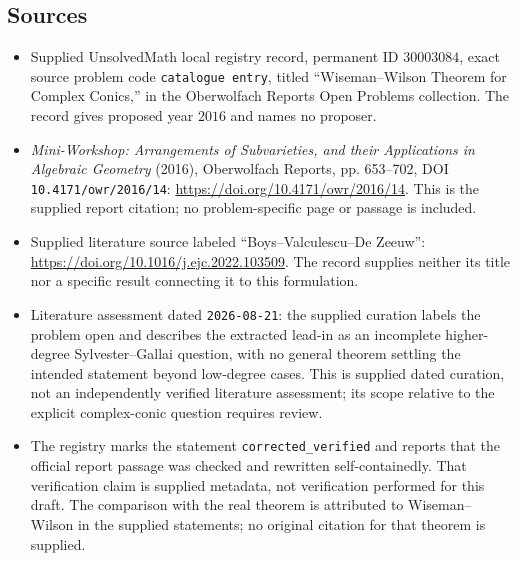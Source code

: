\documentclass[11pt]{article}
\begin{document}
\subsection{Sources}
\begin{itemize}
\item Supplied UnsolvedMath local registry record, permanent ID \(30003084\), exact source problem code \texttt{catalogue entry}, titled ``Wiseman--Wilson Theorem for Complex Conics,'' in the Oberwolfach Reports Open Problems collection. The record gives proposed year \(2016\) and names no proposer.
\item \emph{Mini-Workshop: Arrangements of Subvarieties, and their Applications in Algebraic Geometry} (2016), Oberwolfach Reports, pp. 653--702, DOI \texttt{10.4171/owr/2016/14}: \url{https://doi.org/10.4171/owr/2016/14}. This is the supplied report citation; no problem-specific page or passage is included.
\item Supplied literature source labeled ``Boys--Valculescu--De Zeeuw'': \url{https://doi.org/10.1016/j.ejc.2022.103509}. The record supplies neither its title nor a specific result connecting it to this formulation.
\item Literature assessment dated \texttt{2026-08-21}: the supplied curation labels the problem open and describes the extracted lead-in as an incomplete higher-degree Sylvester--Gallai question, with no general theorem settling the intended statement beyond low-degree cases. This is supplied dated curation, not an independently verified literature assessment; its scope relative to the explicit complex-conic question requires review.
\item The registry marks the statement \texttt{corrected\_verified} and reports that the official report passage was checked and rewritten self-containedly. That verification claim is supplied metadata, not verification performed for this draft. The comparison with the real theorem is attributed to Wiseman--Wilson in the supplied statements; no original citation for that theorem is supplied.
\end{itemize}
\end{document}
